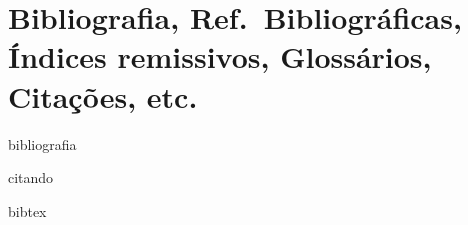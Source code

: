 \section[Bibliografia {\it\&} Cia.{}]{Bibliografia, Ref.\ Bibliográficas, Índices remissivos, Glossários, Citações, etc.}\label{sec:biblio-indice-glossario}

bibliografia

citando

bibtex
